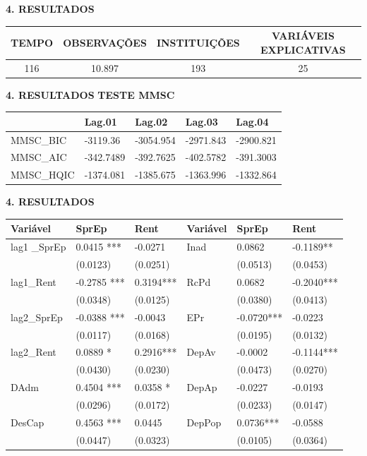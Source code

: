 \documentclass[
  ignorenonframetext,
  aspectratio=169,
  ignorenonframetext]{beamer}
\begin{document}
\begin{frame}{\textbf{4. RESULTADOS}}
\protect\hypertarget{resultados}{}
\begin{longtable}[]{@{}cccc@{}}
\toprule
TEMPO & OBSERVAÇÕES & INSTITUIÇÕES & VARIÁVEIS EXPLICATIVAS \\
\midrule
\endhead
116 & 10.897 & 193 & 25 \\
\bottomrule
\end{longtable}
\end{frame}

\begin{frame}{\textbf{4. RESULTADOS}}
\protect\hypertarget{resultados-1}{}
\textbf{TESTE MMSC}

\begin{longtable}[]{@{}lllll@{}}
\toprule
& Lag.01 & Lag.02 & Lag.03 & Lag.04 \\
\midrule
\endhead
MMSC\_BIC & -3119.36 & -3054.954 & -2971.843 & -2900.821 \\
MMSC\_AIC & -342.7489 & -392.7625 & -402.5782 & -391.3003 \\
MMSC\_HQIC & -1374.081 & -1385.675 & -1363.996 & -1332.864 \\
\bottomrule
\end{longtable}
\end{frame}

\begin{frame}{\textbf{4. RESULTADOS}}
\protect\hypertarget{resultados-2}{}
\begin{longtable}[]{@{}llllll@{}}
\toprule
Variável & SprEp & Rent & Variável & SprEp & Rent \\
\midrule
\endhead
lag1 \_SprEp & 0.0415 *** & -0.0271 & Inad & 0.0862 & -0.1189** \\
& (0.0123) & (0.0251) & & (0.0513) & (0.0453) \\
lag1\_Rent & -0.2785 *** & 0.3194*** & RcPd & 0.0682 & -0.2040*** \\
& (0.0348) & (0.0125) & & (0.0380) & (0.0413) \\
lag2\_SprEp & -0.0388 *** & -0.0043 & EPr & -0.0720*** & -0.0223 \\
& (0.0117) & (0.0168) & & (0.0195) & (0.0132) \\
lag2\_Rent & 0.0889 * & 0.2916*** & DepAv & -0.0002 & -0.1144*** \\
& (0.0430) & (0.0230) & & (0.0473) & (0.0270) \\
DAdm & 0.4504 *** & 0.0358 * & DepAp & -0.0227 & -0.0193 \\
& (0.0296) & (0.0172) & & (0.0233) & (0.0147) \\
DesCap & 0.4563 *** & 0.0445 & DepPop & 0.0736*** & -0.0588 \\
& (0.0447) & (0.0323) & & (0.0105) & (0.0364) \\
\bottomrule
\end{longtable}
\end{frame}
\end{document}
